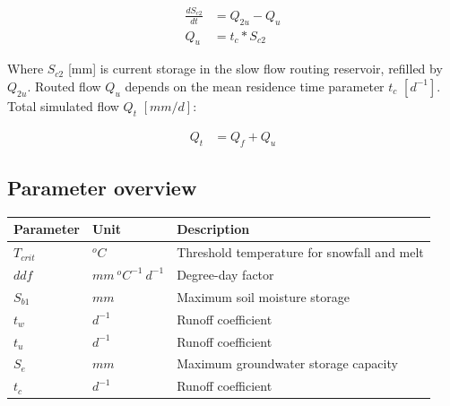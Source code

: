\begin{align}
	\frac{dS_{c2}}{dt} &= Q_{2u}-Q_{u}\\
	Q_u &= t_c*S_{c2}
\end{align}

Where $S_{c2}$ [mm] is current storage in the slow flow routing reservoir, refilled by $Q_{2u}$. Routed flow $Q_u$ depends on the mean residence time parameter $t_c$ $[d^{-1}]$. Total simulated flow $Q_t$ $[mm/d]$:

\begin{align}
	Q_t &= Q_f + Q_u
\end{align}

\subsection{Parameter overview}
\begin{table}[htbp]
  \centering
    \begin{tabular}{lll}
    \toprule
    Parameter & Unit  & Description \\
    \midrule
    $T_{crit}$ & $^oC$ & Threshold temperature for snowfall and melt \\
    $ddf$ & $mm~^oC^{-1}~d^{-1}$ & Degree-day factor \\
    $S_{b1}$ & $mm$  & Maximum soil moisture storage \\
    $t_w$ & $d^{-1}$ & Runoff coefficient \\
    $t_u$ & $d^{-1}$ & Runoff coefficient \\
    $S_e$ & $mm$  & Maximum groundwater storage capacity \\
    $t_c$ & $d^{-1}$ & Runoff coefficient \\
    \bottomrule
    \end{tabular}%
  \label{tab:addlabel}%
\end{table}%

